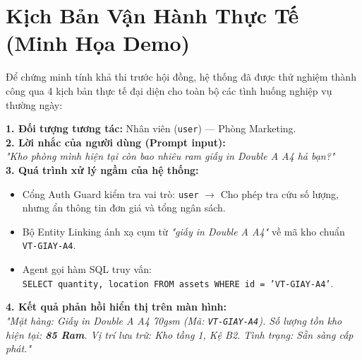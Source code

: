 \documentclass[11pt,a4paper]{article}
\begin{document}
\newpage

\section{Kịch Bản Vận Hành Thực Tế (Minh Họa Demo)}

Để chứng minh tính khả thi trước hội đồng, hệ thống đã được thử nghiệm thành công qua 4 kịch bản thực tế đại diện cho toàn bộ các tình huống nghiệp vụ thường ngày:

\begin{scenariobox}
\textbf{1. Đối tượng tương tác:} Nhân viên (\texttt{user}) — Phòng Marketing.\\
\textbf{2. Lời nhắc của người dùng (Prompt input):}\\
\textit{"Kho phòng mình hiện tại còn bao nhiêu ram giấy in Double A A4 hả bạn?"}\\
\textbf{3. Quá trình xử lý ngầm của hệ thống:}
\begin{itemize}[leftmargin=1.2em, itemsep=2pt]
    \item Cổng Auth Guard kiểm tra vai trò: \texttt{user} $\rightarrow$ Cho phép tra cứu số lượng, nhưng ẩn thông tin đơn giá và tổng ngân sách.
    \item Bộ Entity Linking ánh xạ cụm từ \textit{"giấy in Double A A4"} về mã kho chuẩn \texttt{VT-GIAY-A4}.
    \item Agent gọi hàm SQL truy vấn:\\ \texttt{SELECT quantity, location FROM assets WHERE id = 'VT-GIAY-A4'}.
\end{itemize}
\textbf{4. Kết quả phản hồi hiển thị trên màn hình:}\\
\textit{"Mặt hàng: Giấy in Double A A4 70gsm (Mã: \texttt{VT-GIAY-A4}). Số lượng tồn kho hiện tại: \textbf{85 Ram}. Vị trí lưu trữ: Kho tầng 1, Kệ B2. Tình trạng: Sẵn sàng cấp phát."}
\end{scenariobox}
\end{document}
